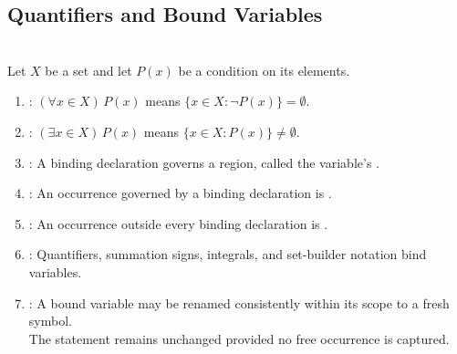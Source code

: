 \subsection{Quantifiers and Bound Variables}

\begin{definition} \label{def:bound-and-free-variable-scope} \\
Let $X$ be a set and let $P(x)$ be a condition on its elements.
\begin{enumerate}[label=(\roman*)]
\setlength{\itemsep}{0pt}
\item {}: $(\forall x\in X)\,P(x)$ means $\{x\in X:\neg P(x)\}=\emptyset$.
\item {}: $(\exists x\in X)\,P(x)$ means $\{x\in X:P(x)\}\neq\emptyset$.
\item {}: A binding declaration governs a region, called the variable's .
\item {}: An occurrence governed by a binding declaration is .
\item {}: An occurrence outside every binding declaration is .
\item {}: Quantifiers, summation signs, integrals, and set-builder notation bind variables.
\item {}: A bound variable may be renamed consistently within its scope to a fresh symbol.\\
The statement remains unchanged provided no free occurrence is captured.
\end{enumerate}
\end{definition}

